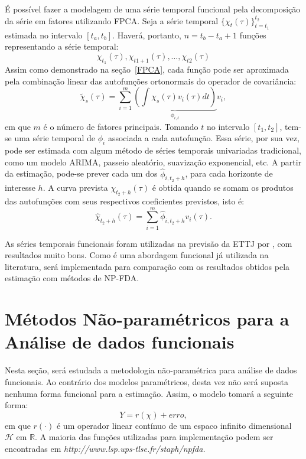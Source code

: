\documentclass[
	12pt,				%
	openright,			%
	oneside,			%
	a4paper,			%
	english,			%
	brazil				%
	]{dissertacao-ufrgs-abntex2}
\begin{document}
É possível fazer a modelagem de uma série temporal funcional pela decomposição da série em fatores utilizando FPCA. Seja a série temporal $\{ \chi_t(\tau) \}_{t=t_1}^{t_2}$ estimada no  intervalo $[t_a,t_b]$. Haverá, portanto, $n=t_b-t_a+1$ funções representando a série temporal:
\begin{equation}
\chi_{t_1}(\tau), \chi_{t1+1}(\tau), \dots, \chi_{t2}(\tau)
\end{equation}
Assim como demonstrado na seção~\ref{FPCA}, cada função pode ser aproximada pela combinação linear das autofunções ortonormais do operador de covariância:
\begin{equation}
\widetilde{\chi}_s(\tau)=\sum_{i=1}^{m}{ \underbrace{ \left(  \int \chi_s(\tau)  v_i(\tau)dt \right) }_{\phi_{i,t}} } v_i,
\end{equation}
em que $m$ é o número de fatores principais.
Tomando $t$ no intervalo $[t_1,t_2]$, tem-se uma série temporal de $\phi_i$ associada a cada autofunção. Essa série, por sua vez, pode ser estimada com algum método de séries temporais univariadas tradicional, como um modelo ARIMA, passeio aleatório, suavização exponencial, etc. A partir da estimação, pode-se prever cada um dos $\hat{\phi}_{i,t_2+h}$, para cada horizonte de interesse $h$. A curva prevista $\chi_{t_2+h}(\tau)$ é obtida quando se somam os produtos das autofunções com seus respectivos coeficientes previstos, isto é:
\begin{equation}
\hat{\chi}_{t_2+h}(\tau)= \sum_{i=1}^{m}{\hat{\phi}_{i,t_2+h} v_i(\tau) }.
\end{equation}

As séries temporais funcionais foram utilizadas na previsão da ETTJ por , com resultados muito bons. Como é uma abordagem funcional já utilizada na literatura, será implementada para comparação com os resultados obtidos pela estimação com métodos de NP-FDA. 

\section{Métodos Não-paramétricos para a Análise de dados funcionais}

Nesta seção, será estudada a metodologia não-paramétrica para análise
de dados funcionais. Ao contrário dos modelos paramétricos, desta
vez não será suposta nenhuma forma funcional para a estimação. Assim,
o modelo tomará a seguinte forma:
\[
Y=r(\chi)+erro,
\]
em que $r(\cdot)$ é um operador linear contínuo de um espaco infinito dimensional $\mathcal{H}$
em $\mathbb{R}$. A maioria das funções utilizadas para implementação
podem ser encontradas em \emph{http://www.lsp.ups-tlse.fr/staph/npfda. }
\end{document}
